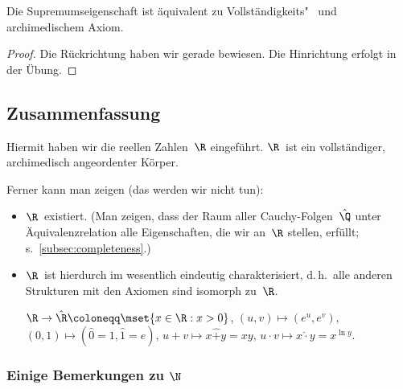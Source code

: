 \documentclass[a4paper]{article}
\begin{document}
\begin{theorem}
    Die Supremumseigenschaft ist äquivalent zu Vollständigkeits"~ und archimedischem Axiom.
\end{theorem}

\begin{proof}
    Die Rückrichtung haben wir gerade bewiesen. Die Hinrichtung erfolgt in der Übung.
\end{proof}

\subsection{Zusammenfassung}

Hiermit haben wir die reellen Zahlen~$\R$ eingeführt. $\R$~ist ein vollständiger, archimedisch angeordenter Körper.

Ferner kann man zeigen (das werden wir nicht tun):
\begin{itemize}
    \item $\R$~existiert. (Man zeigen, dass der Raum aller Cauchy-Folgen~$\hat{\Q}$ unter Äquivalenzrelation alle Eigenschaften, die wir an~$\R$ stellen, erfüllt; s.~\cref{subsec:completeness}.)
    \item $\R$~ist hierdurch im wesentlich eindeutig charakterisiert, d.\,h.\ alle anderen Strukturen mit den Axiomen sind isomorph zu~$\R$.

          \begin{example}
              $\R \to \hat{\R} \coloneqq \mset{x \in \R : x > 0}$, $(u, v) \mapsto (e^u, e^v)$, $(0, 1) \mapsto (\hat{0} = 1, \hat{1} = e)$, $u + v \mapsto x \mathrel{\hat{+}} y = xy$, $u \cdot v \mapsto x \mathrel{\hat{\cdot}} y = x^{\ln y}$.
          \end{example}
\end{itemize}

\subsubsection{Einige Bemerkungen zu \texorpdfstring{$\N$}{N}}
\end{document}
